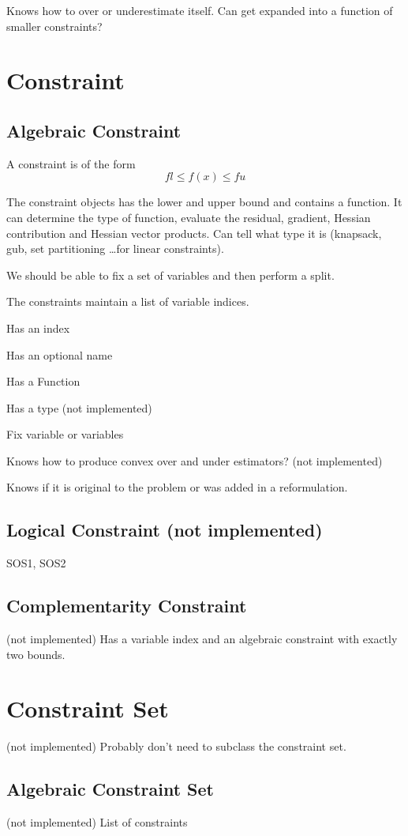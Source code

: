 \documentclass[10pt]{report}
\newcommand{\notimpl}[0]{(not implemented)}
\begin{document}
Knows how to over or underestimate itself.  Can get expanded into a 
function of smaller constraints?

\section{Constraint}

\subsection{Algebraic Constraint}
A constraint is of the form
\[
   fl \leq f(x) \leq fu
\]

The constraint objects has the lower and upper bound and contains a 
function.  It can determine the type of function, evaluate the residual,
gradient, Hessian contribution and Hessian vector products. Can tell what type
it is (knapsack, gub, set partitioning \ldots for linear constraints).

We should be able to fix a set of variables and then perform a split.

The constraints maintain a list of variable indices.

Has an index

Has an optional name

Has a Function 

Has a type \notimpl

Fix variable or variables

Knows how to produce convex over and under estimators? \notimpl

Knows if it is original to the problem or was added in a reformulation.

\subsection{Logical Constraint \notimpl}
SOS1, SOS2

\subsection{Complementarity Constraint} \notimpl
Has a variable index and an algebraic constraint with exactly two
bounds.  

\section{Constraint Set} \notimpl
Probably don't need to subclass the constraint set.

\subsection{Algebraic Constraint Set} \notimpl
List of constraints
\end{document}
